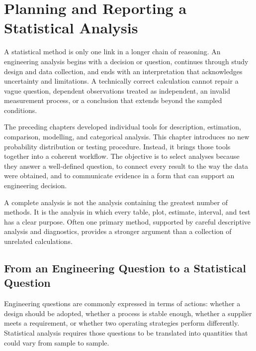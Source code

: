 \chapter{Planning and Reporting a Statistical Analysis}
\label{ch:integrated-analysis}

A statistical method is only one link in a longer chain of reasoning. An engineering analysis begins with a decision or question, continues through study design and data collection, and ends with an interpretation that acknowledges uncertainty and limitations. A technically correct calculation cannot repair a vague question, dependent observations treated as independent, an invalid measurement process, or a conclusion that extends beyond the sampled conditions.

The preceding chapters developed individual tools for description, estimation, comparison, modelling, and categorical analysis. This chapter introduces no new probability distribution or testing procedure. Instead, it brings those tools together into a coherent workflow. The objective is to select analyses because they answer a well-defined question, to connect every result to the way the data were obtained, and to communicate evidence in a form that can support an engineering decision.

A complete analysis is not the analysis containing the greatest number of methods. It is the analysis in which every table, plot, estimate, interval, and test has a clear purpose. Often one primary method, supported by careful descriptive analysis and diagnostics, provides a stronger argument than a collection of unrelated calculations.

\section{From an Engineering Question to a Statistical Question}
\label{sec:engineering-to-statistical-question}

Engineering questions are commonly expressed in terms of actions: whether a design should be adopted, whether a process is stable enough, whether a supplier meets a requirement, or whether two operating strategies perform differently. Statistical analysis requires those questions to be translated into quantities that could vary from sample to sample.

